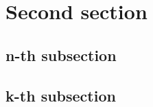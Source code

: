 \section{Second section}
\lipsum[6]

\subsection{n-th subsection}

\subsection{k-th subsection}
\lipsum[7]
\lipsum[8]
